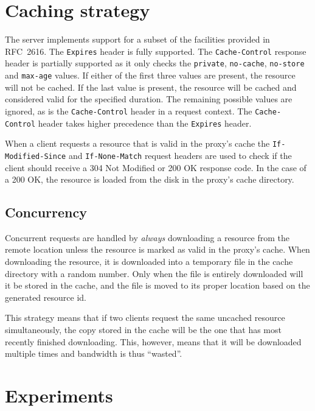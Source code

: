 \documentclass{sig-alternate}
\begin{document}
\section{Caching strategy}
\label{sec:cachestrategy}

The server implements support for a subset of the facilities provided
in RFC~2616. The \verb+Expires+ header is fully supported. The
\verb+Cache-Control+ response header is partially supported as it only checks
the \verb+private+, \verb+no-cache+, \verb+no-store+ and \verb+max-age+
values. If either of the first three values are present, the resource will
not be cached. If the last value is present, the resource will be cached and
considered valid for the specified duration. The remaining possible values
are ignored, as is the \verb+Cache-Control+ header in a request context. The
\verb+Cache-Control+ header takes higher precedence than the \verb+Expires+
header.

When a client requests a resource that is valid in the proxy's cache the
\verb+If-Modified-Since+ and \verb+If-None-Match+ request headers are used to
check if the client should receive a 304 Not Modified or 200 OK response code.
In the case of a 200 OK, the resource is loaded from the disk in the proxy's
cache directory.

\subsection{Concurrency}
\label{sec:concurrency}

Concurrent requests are handled by \emph{always} downloading a resource from
the remote location unless the resource is marked as valid in the proxy's
cache. When downloading the resource, it is downloaded into a temporary file
in the cache directory with a random number. Only when the file is entirely
downloaded will it be stored in the cache, and the file is moved to its proper
location based on the generated resource id.

This strategy means that if two clients request the same uncached resource
simultaneously, the copy stored in the cache will be the one that has most
recently finished downloading. This, however, means that it will be downloaded
multiple times and bandwidth is thus ``wasted''.


\section{Experiments}
\label{sec:experiments}
\end{document}
